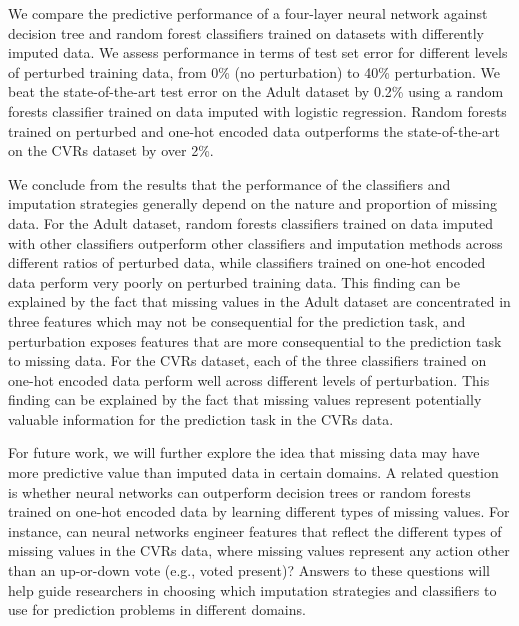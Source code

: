 \documentclass[10pt]{book}
\theoremstyle{definition}
\begin{document}
We compare the predictive performance of a four-layer neural network against decision tree and random forest classifiers trained on datasets with differently imputed data. We assess performance in terms of test set error for different levels of perturbed training data, from 0\% (no perturbation) to 40\% perturbation. We beat the state-of-the-art test error on the Adult dataset by 0.2\% using a random forests classifier trained on data imputed with logistic regression. Random forests trained on perturbed and one-hot encoded data outperforms the state-of-the-art on the CVRs dataset by over 2\%. 

We conclude from the results that the performance of the classifiers and imputation strategies generally depend on the nature and proportion of missing data. For the Adult dataset, random forests classifiers trained on data imputed with other classifiers outperform other classifiers and imputation methods across different ratios of perturbed data, while classifiers trained on one-hot encoded data perform very poorly on perturbed training data. This finding can be explained by the fact that missing values in the Adult dataset are concentrated in three features which may not be consequential for the prediction task, and perturbation exposes features that are more consequential to the prediction task to missing data. For the CVRs dataset, each of the three classifiers trained on one-hot encoded data perform well across different levels of perturbation. This finding can be explained by the fact that missing values represent potentially valuable information for the prediction task in the CVRs data.

For future work, we will further explore the idea that missing data may have more predictive value than imputed data in certain domains. A related question is whether neural networks can outperform decision trees or random forests trained on one-hot encoded data by learning different types of missing values. For instance, can neural networks engineer features that reflect the different types of missing values in the CVRs data, where missing values represent any action other than an up-or-down vote (e.g., voted present)? Answers to these questions will help guide researchers in choosing which imputation strategies and classifiers to use for prediction problems in different domains. 
\par
\vskip 14pt
\end{document}
